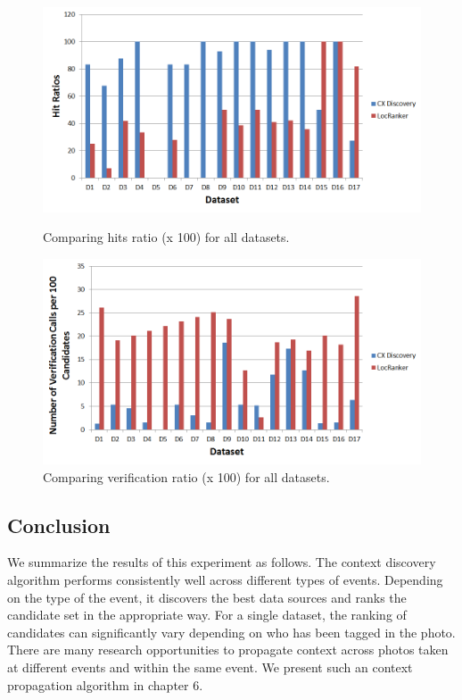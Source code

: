 \begin{figure}[h!]

\begin{minipage}[b]{\linewidth}
\centering
\includegraphics[width=\textwidth]{media/chapter5/axis/hits-ratio-comparison-all-datasets.png}
\end{minipage}
\caption{Comparing hits ratio (x 100) for all datasets.}
\label{fig:hits-ratio-comparison}

\vspace{0.5cm}

\begin{minipage}[b]{\linewidth}
\centering
\includegraphics[width=\textwidth]{media/chapter5/axis/verification-ratio-comparison-all-datasets.png}
\end{minipage}
\caption{Comparing verification ratio (x 100) for all datasets.}
\label{fig:verification-ratio-comparison}

\end{figure}

\subsection{Conclusion}
We summarize the results of this experiment as follows. The context discovery algorithm performs consistently well across different types of events. Depending on the type of the event, it discovers the best data sources and ranks the candidate set in the appropriate way. For a single dataset, the ranking of candidates can significantly vary depending on who has been tagged in the photo. There are many research opportunities to propagate context across photos taken at different events and within the same event. We present such an context propagation algorithm in chapter 6.

